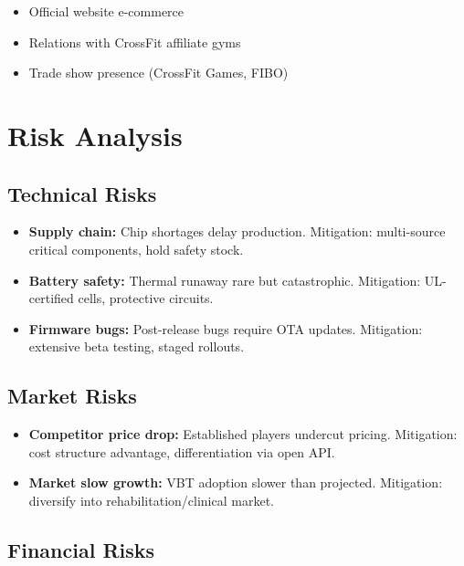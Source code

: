 \begin{itemize}
    \item Official website e-commerce
    \item Relations with CrossFit affiliate gyms
    \item Trade show presence (CrossFit Games, FIBO)
\end{itemize}

\section{Risk Analysis}

\subsection{Technical Risks}

\begin{itemize}
    \item \textbf{Supply chain:} Chip shortages delay production. Mitigation: multi-source critical components, hold safety stock.
    \item \textbf{Battery safety:} Thermal runaway rare but catastrophic. Mitigation: UL-certified cells, protective circuits.
    \item \textbf{Firmware bugs:} Post-release bugs require OTA updates. Mitigation: extensive beta testing, staged rollouts.
\end{itemize}

\subsection{Market Risks}

\begin{itemize}
    \item \textbf{Competitor price drop:} Established players undercut pricing. Mitigation: cost structure advantage, differentiation via open API.
    \item \textbf{Market slow growth:} VBT adoption slower than projected. Mitigation: diversify into rehabilitation/clinical market.
\end{itemize}

\subsection{Financial Risks}

